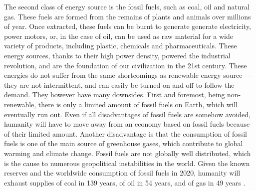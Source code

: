 \documentclass[my_thesis.tex]{subfiles}
\begin{document}
The second class of energy source is the fossil fuels, such as coal, oil and natural gas. These fuels are formed from the remains of plants and animals over millions of year. Once extracted, these fuels can be burnt to generate generate electricity, power motors, or, in the case of oil, can be used as raw material for a wide variety of products, including plastic, chemicals and pharmaceuticals. These energy sources, thanks to their high power density, powered the industrial revolution, and are the foundation of our civilization in the 21st century. These energies do not suffer from the same shortcomings as renewable energy source --- they are not intermittent, and can easily be turned on and off to follow the demand. They however have many downsides. First and foremost, being non-renewable, there is only a limited amount of fossil fuels on Earth, which will eventually run out. Even if all disadvantages of fossil fuels are somehow avoided, humanity will have to move away from an economy based on fossil fuels because of their limited amount. Another disadvantage is that the consumption of fossil fuels is one of the main source of greenhouse gases, which contribute to global warming and climate change. Fossil fuels are not globally well distributed, which is the cause to numerous geopolitical instabilities in the world. Given the known reserves and the worldwide consumption of fossil fuels in 2020, humanity will exhaust supplies of coal in 139 years, of oil in 54 years, and of gas in 49 years \citep{bpBPStatisticalReview2020}.
\end{document}
